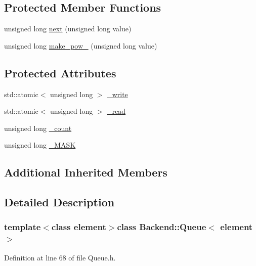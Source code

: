 \subsection*{Protected Member Functions}
\begin{DoxyCompactItemize}
\item 
unsigned long \hyperlink{class_backend_1_1_queue_a91b2f12926d36b547343a91790fe76bb}{next} (unsigned long value)
\item 
unsigned long \hyperlink{class_backend_1_1_queue_a357667a720d3cf0e1867e79e2911ca13}{make\+\_\+pow\+\_} (unsigned long value)
\end{DoxyCompactItemize}
\subsection*{Protected Attributes}
\begin{DoxyCompactItemize}
\item 
std\+::atomic$<$ unsigned long $>$ \hyperlink{class_backend_1_1_queue_ab3d5c4738092cf356b36c56f6ab61554}{\+\_\+write}
\item 
std\+::atomic$<$ unsigned long $>$ \hyperlink{class_backend_1_1_queue_a508eb8c4fedb73fc4abbf26353bdfd82}{\+\_\+read}
\item 
unsigned long \hyperlink{class_backend_1_1_queue_ab49d17e24dc0f8a2e5e44c182c240249}{\+\_\+count}
\item 
unsigned long \hyperlink{class_backend_1_1_queue_ab665bcab528d6bad6c4faab1ae0fc1b4}{\+\_\+\+M\+A\+S\+K}
\end{DoxyCompactItemize}
\subsection*{Additional Inherited Members}


\subsection{Detailed Description}
\subsubsection*{template$<$class element$>$class Backend\+::\+Queue$<$ element $>$}



Definition at line 68 of file Queue.\+h.



